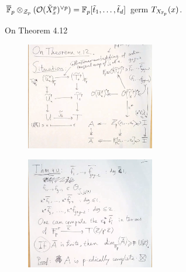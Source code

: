 $\overline{\mathbb{F}}_p \otimes_{\mathcal{Z}_p} (\mathcal{O}(\tilde{X}_x^p)^{\vee p})= \mathbb{F}_p[\tilde{t}_1,\ldots,\tilde{t}_d]$ germ $T_{X_{\mathbb{F}_p}}(x)$. 


On Theorem 4.12 



	\begin{figure}[!ht]
	\centering
	\includegraphics[width=0.5\textwidth]{../images/im32.png}
	\end{figure}

	\begin{figure}[!ht]
	\centering
	\includegraphics[width=0.5\textwidth]{../images/im33.png}
	\end{figure}


























